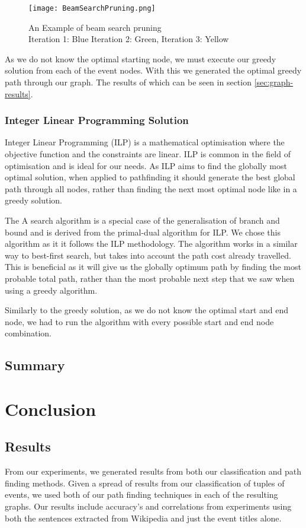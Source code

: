 \documentclass[bsc,frontabs,twoside,singlespacing,parskip,deptreport]{infthesis}     %
\begin{document}
\begin{figure}
  \texttt{[image: BeamSearchPruning.png]}
  \caption{An Example of beam search pruning\\ Iteration 1: Blue Iteration 2: Green, Iteration 3: Yellow}
  \label{fig:beam-prune}
\end{figure}

As we do not know the optimal starting node, we must execute our greedy solution from each of the event nodes.
With this we generated the optimal greedy path through our graph. The results of which can be seen in section \ref{sec:graph-results}.

\subsection{Integer Linear Programming Solution}
Integer Linear Programming (ILP) is a mathematical optimisation where the objective function and the constraints are linear.
ILP is common in the field of optimisation and is ideal for our needs. As ILP aims to find the globally most optimal solution, when applied to pathfinding it
should generate the best global path through all nodes, rather than finding the next most optimal node like in a greedy solution.


The A\* search algorithm is a special case of the generalisation of branch and bound\cite{balas1983branch} and is derived from the primal-dual algorithm for ILP\cite{ye2012note}.
We chose this algorithm as it it follows the ILP methodology. The algorithm works in a similar way to best-first search, but takes into account the path cost already travelled.
This is beneficial as it will give us the globally optimum path by finding the most probable total path, rather than the most probable next step that we saw when using a
greedy algorithm.

Similarly to the greedy solution, as we do not know the optimal start and end node, we had to run the algorithm with every possible start and end node combination.


\section{Summary}

\chapter{Conclusion}
\section{Results}
From our experiments, we generated results from both our classification and path finding methods.
Given a spread of results from our classification of tuples of events, we used both of our path finding
techniques in each of the resulting graphs. Our results include accuracy's and correlations from
experiments using both the sentences extracted from Wikipedia and just the event titles alone.   
\end{document}
